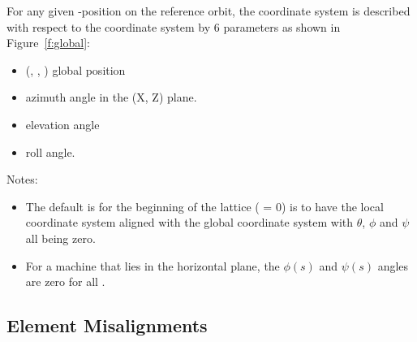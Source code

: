 \documentclass{hitec}     %
\begin{document}
For any given -position on the reference orbit, the  coordinate system is described with
respect to the  coordinate system by 6 parameters as shown in Figure~\ref{f:global}:
\vspace{-5 pt}
\begin{itemize}
\item (, , ) global position
\item \vn{$\theta$} azimuth angle in the (X, Z) plane.
\item \vn{$\phi$} elevation angle
\item \vn{$\psi$} roll angle.
\end{itemize}

Notes:
\vspace{-5 pt}
\begin{itemize}
\item 
The default is for the beginning of the lattice ( = 0) is to have the local 
coordinate system aligned with the global  coordinate system with $\theta$, $\phi$ and
$\psi$ all being zero.
\item 
For a machine that lies in the horizontal plane, the $\phi(s)$ and $\psi(s)$ angles are zero for all
.
\end{itemize}

\newpage

\subsection{Element Misalignments}
\label{s:ele.mis}
\end{document}
